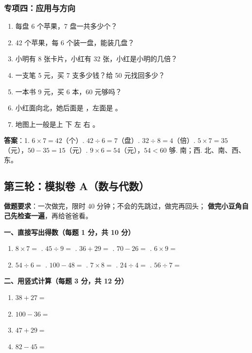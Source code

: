 \subsubsection{专项四：应用与方向}
\begin{enumerate}[label=\arabic*.,itemsep=3pt]
  \item 每盘 6 个苹果，7 盘一共多少个？
  \item 42 个苹果，每 6 个装一盘，能装几盘？
  \item 小明有 8 张卡片，小红有 32 张，小红是小明的几倍？
  \item 一支笔 5 元，买 7 支多少钱？给 50 元找回多少？
  \item 一本书 9 元，买 6 本，60 元够吗？
  \item 小红面向北，她后面是 \blank[1.2cm]，左面是 \blank[1.2cm]。
  \item 地图上一般是上 \blank[1cm] 下 \blank[1cm] 左 \blank[1cm] 右 \blank[1cm]。
\end{enumerate}
\textbf{答案}：1. $6\times7=42$（个）. $42\div6=7$（盘）. $32\div8=4$（倍）. $5\times7=35$（元），$50-35=15$（元）. $9\times6=54$（元），$54<60$ 够. 南；西. 北、南、西、东。

\subsection{第三轮：模拟卷 A（数与代数）}

\begin{tipbox}
\textbf{做题要求}：一次做完，限时 40 分钟；不会的先跳过，做完再回头；
\textbf{做完小豆角自己先检查一遍}，再给爸爸看。
\end{tipbox}

\noindent\textbf{一、直接写出得数（每题 1 分，共 10 分）}
\begin{enumerate}[label=\arabic*.,itemsep=2pt]
  \item $8\times7=$ \blank[1.4cm] . $45\div9=$ \blank[1.4cm] . $36+29=$ \blank[1.4cm] . $70-26=$ \blank[1.4cm] . $6\times9=$ \blank[1.4cm]
  \item $54\div6=$ \blank[1.4cm] . $100-48=$ \blank[1.4cm] . $7\times8=$ \blank[1.4cm] . $24\div4=$ \blank[1.4cm] . $56\div7=$ \blank[1.4cm]
\end{enumerate}

\noindent\textbf{二、用竖式计算（每题 3 分，共 12 分）}
\begin{enumerate}[label=\arabic*.,itemsep=6pt]
  \item $38+27=$ \wls[2]
  \item $100-36=$ \wls[2]
  \item $47+29=$ \wls[2]
  \item $82-45=$ \wls[2]
\end{enumerate}

